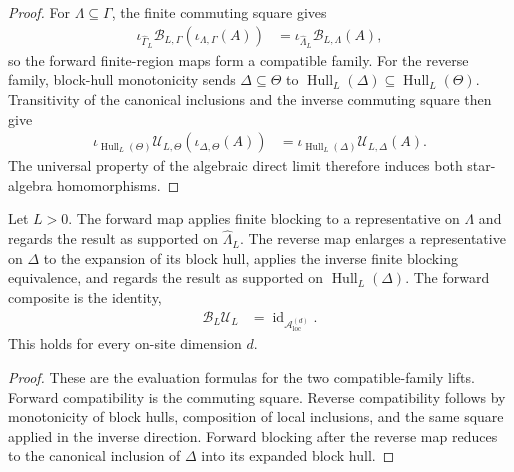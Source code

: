 \begin{proof}\leanok
    For $\Lambda\subseteq\Gamma$, the finite commuting square gives
    \begin{align}
        \iota_{\widehat\Gamma_L}
        \mathcal B_{L,\Gamma}(\iota_{\Lambda,\Gamma}(A))
         & =\iota_{\widehat\Lambda_L}\mathcal B_{L,\Lambda}(A),
    \end{align}
    so the forward finite-region maps form a compatible family.  For the
    reverse family, block-hull monotonicity sends $\Delta\subseteq\Theta$ to
    $\operatorname{Hull}_L(\Delta)\subseteq
        \operatorname{Hull}_L(\Theta)$.  Transitivity of the canonical inclusions
    and the inverse commuting square then give
    \begin{align}
        \iota_{\operatorname{Hull}_L(\Theta)}
        \mathcal U_{L,\Theta}(\iota_{\Delta,\Theta}(A))
         & =\iota_{\operatorname{Hull}_L(\Delta)}
        \mathcal U_{L,\Delta}(A).
    \end{align}
    The universal property of the algebraic direct limit therefore induces
    both star-algebra homomorphisms.
\end{proof}

\begin{lemma}
    \label{lem:qca_algebraic_blocking_maps_evaluation}
    \leanok
    Let $L>0$.  The forward map applies finite blocking to a representative on
    $\Lambda$ and regards the result as supported on $\widehat\Lambda_L$.  The
    reverse map enlarges a representative on $\Delta$ to the expansion of its
    block hull, applies the inverse finite blocking equivalence, and regards
    the result as supported on $\operatorname{Hull}_L(\Delta)$.  The forward
    composite is the identity,
    \begin{align}
        \mathcal B_L\mathcal U_L
         & =\operatorname{id}_{\mathcal A_{\mathrm{loc}}^{(d)}}.
    \end{align}
    This holds for every on-site dimension $d$.
\end{lemma}

\begin{proof}\leanok
    These are the evaluation formulas for the two compatible-family lifts.
    Forward compatibility is the commuting square.  Reverse compatibility
    follows by monotonicity of block hulls, composition of local inclusions,
    and the same square applied in the inverse direction.  Forward blocking
    after the reverse map reduces to the canonical inclusion of $\Delta$ into
    its expanded block hull.
\end{proof}


